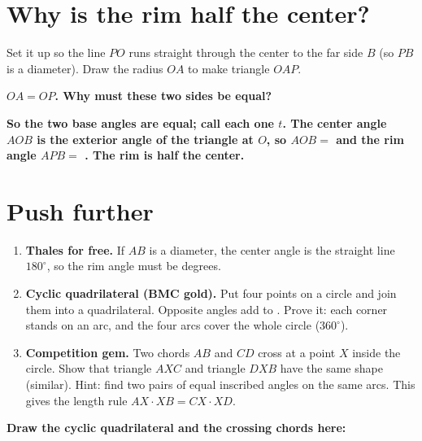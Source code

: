 \documentclass[11pt]{article}
\newcommand{\drawbox}[1]{%
  \par\vspace{4pt}\noindent
  \fbox{\rule{0pt}{#1}\rule{\dimexpr\linewidth-2\fboxsep-2\fboxrule}{0pt}}%
  \par\vspace{6pt}}
\newcommand{\task}[1]{\par\medskip\noindent\textbf{\color{benblue}#1}\par\nopagebreak}
\begin{document}
\section*{Why is the rim half the center?}
Set it up so the line $PO$ runs straight through the center to the far side $B$
(so $PB$ is a diameter). Draw the radius $OA$ to make triangle $OAP$.

\task{$OA = OP$. Why must these two sides be equal?
\underline{\hspace{6.5cm}}}
\task{So the two base angles are equal; call each one $t$. The center angle $AOB$
is the exterior angle of the triangle at $O$, so $AOB = $
\underline{\hspace{1.8cm}} and the rim angle $APB = $ \underline{\hspace{1.8cm}}.
The rim is half the center.}
\drawbox{1.5cm}

\section*{Push further}
\begin{enumerate}[leftmargin=*]
  \item \textbf{Thales for free.} If $AB$ is a diameter, the center angle is the
        straight line $180^\circ$, so the rim angle must be
        \underline{\hspace{1.6cm}} degrees.
  \item \textbf{Cyclic quadrilateral (BMC gold).} Put four points on a circle and
        join them into a quadrilateral. Opposite angles add to
        \underline{\hspace{1.6cm}}. Prove it: each corner stands on an arc, and
        the four arcs cover the whole circle ($360^\circ$).
  \item \textbf{Competition gem.} Two chords $AB$ and $CD$ cross at a point $X$
        inside the circle. Show that triangle $AXC$ and triangle $DXB$ have the
        same shape (similar). Hint: find two pairs of equal inscribed angles on
        the same arcs. This gives the length rule $AX \cdot XB = CX \cdot XD$.
\end{enumerate}

\task{Draw the cyclic quadrilateral and the crossing chords here:}
\drawbox{3.2cm}
\end{document}
